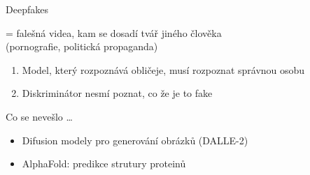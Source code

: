 \documentclass[aspectratio=169,dvipsnames]{beamer}
\begin{document}
\begin{frame}{Deepfakes}

    \begin{center}

        {\Large = falešná videa, kam se dosadí tvář jiného člověka} \\

        (pornografie, politická propaganda)

    \end{center}

    \vspace{15pt}


    \begin{enumerate}

        \item<3-> Model, který rozpoznává obličeje, musí rozpoznat správnou osobu

        \item<4-> Diskriminátor nesmí poznat, co že je to fake

    \end{enumerate}

\end{frame}


\begin{frame}{Co se nevešlo \ldots}

    \begin{itemize}

        \item Difusion modely pro generování obrázků (DALLE-2)

        \item AlphaFold: predikce strutury proteinů

    \end{itemize}

\end{frame}

\end{document}
